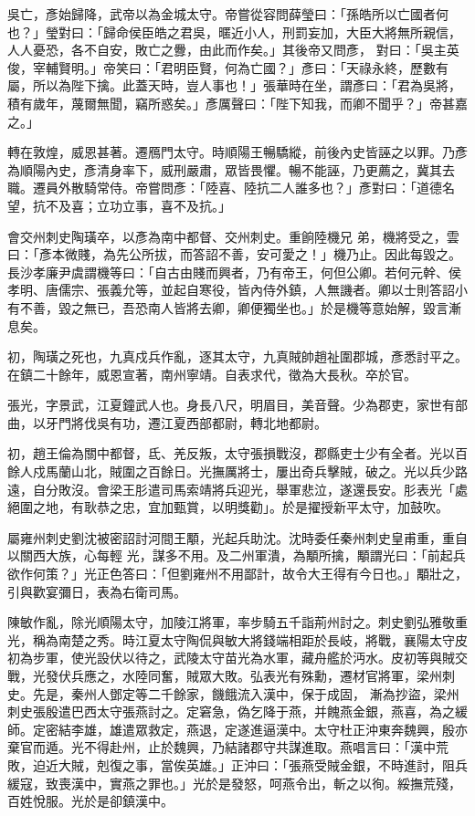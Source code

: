 \begin{pinyinscope}
 吳亡，彥始歸降，武帝以為金城太守。帝嘗從容問薛瑩曰：「孫皓所以亡國者何也？」瑩對曰：「歸命侯臣皓之君吳，暱近小人，刑罰妄加，大臣大將無所親信，人人憂恐，各不自安，敗亡之釁，由此而作矣。」其後帝又問彥，
 對曰：「吳主英俊，宰輔賢明。」帝笑曰：「君明臣賢，何為亡國？」彥曰：「天祿永終，歷數有屬，所以為陛下擒。此蓋天時，豈人事也！」張華時在坐，謂彥曰：「君為吳將，積有歲年，蔑爾無聞，竊所惑矣。」彥厲聲曰：「陛下知我，而卿不聞乎？」帝甚嘉之。」



 轉在敦煌，威恩甚著。遷鴈門太守。時順陽王暢驕縱，前後內史皆誣之以罪。乃彥為順陽內史，彥清身率下，威刑嚴肅，眾皆畏懼。暢不能誣，乃更薦之，冀其去職。遷員外散騎常侍。帝嘗問彥：「陸喜、陸抗二人誰多也？」彥對曰：「道德名望，抗不及喜；立功立事，喜不及抗。」



 會交州刺史陶璜卒，以彥為南中都督、交州刺史。重餉陸機兄
 弟，機將受之，雲曰：「彥本微賤，為先公所拔，而答詔不善，安可愛之！」機乃止。因此每毀之。長沙孝廉尹虞謂機等曰：「自古由賤而興者，乃有帝王，何但公卿。若何元幹、侯孝明、唐儒宗、張義允等，並起自寒役，皆內侍外鎮，人無譏者。卿以士則答詔小有不善，毀之無已，吾恐南人皆將去卿，卿便獨坐也。」於是機等意始解，毀言漸息矣。



 初，陶璜之死也，九真戍兵作亂，逐其太守，九真賊帥趙祉圍郡城，彥悉討平之。在鎮二十餘年，威恩宣著，南州寧靖。自表求代，徵為大長秋。卒於官。



 張光，字景武，江夏鐘武人也。身長八尺，明眉目，美音聲。少為郡吏，家世有部曲，以牙門將伐吳有功，遷江夏西部都尉，轉北地都尉。



 初，趙王倫為關中都督，氐、羌反叛，太守張損戰沒，郡縣吏士少有全者。光以百餘人戍馬蘭山北，賊圍之百餘日。光撫厲將士，屢出奇兵擊賊，破之。光以兵少路遠，自分敗沒。會梁王肜遣司馬索靖將兵迎光，舉軍悲泣，遂還長安。肜表光「處絕圍之地，有耿恭之忠，宜加甄賞，以明獎勸」。於是擢授新平太守，加鼓吹。



 屬雍州刺史劉沈被密詔討河間王顒，光起兵助沈。沈時委任秦州刺史皇甫重，重自以關西大族，心每輕
 光，謀多不用。及二州軍潰，為顒所擒，顒謂光曰：「前起兵欲作何策？」光正色答曰：「但劉雍州不用鄙計，故令大王得有今日也。」顒壯之，引與歡宴彌日，表為右衛司馬。



 陳敏作亂，除光順陽太守，加陵江將軍，率步騎五千詣荊州討之。刺史劉弘雅敬重光，稱為南楚之秀。時江夏太守陶侃與敏大將錢端相距於長岐，將戰，襄陽太守皮初為步軍，使光設伏以待之，武陵太守苗光為水軍，藏舟艦於沔水。皮初等與賊交戰，光發伏兵應之，水陸同奮，賊眾大敗。弘表光有殊勳，遷材官將軍，梁州刺史。先是，秦州人鄧定等二千餘家，饑餓流入漢中，保于成固，
 漸為抄盜，梁州刺史張殷遣巴西太守張燕討之。定窘急，偽乞降于燕，并餽燕金銀，燕喜，為之緩師。定密結李雄，雄遣眾救定，燕退，定遂進逼漢中。太守杜正沖東奔魏興，殷亦棄官而遁。光不得赴州，止於魏興，乃結諸郡守共謀進取。燕唱言曰：「漢中荒敗，迫近大賊，剋復之事，當俟英雄。」正沖曰：「張燕受賊金銀，不時進討，阻兵緩寇，致喪漢中，實燕之罪也。」光於是發怒，呵燕令出，斬之以徇。綏撫荒殘，百姓悅服。光於是卻鎮漢中。




\end{pinyinscope}
